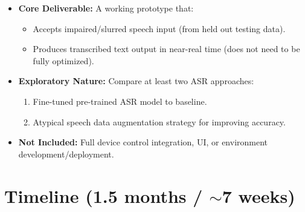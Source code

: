 \documentclass{article}
\begin{document}
\begin{itemize}
    \item \textbf{Core Deliverable:} A working prototype that:
    \begin{itemize}
        \item Accepts impaired/slurred speech input (from held out testing data).
        \item Produces transcribed text output in near-real time (does not need to be fully optimized).
    \end{itemize}
    
    \item \textbf{Exploratory Nature:} Compare at least two ASR approaches:
    \begin{enumerate}
        \item Fine-tuned pre-trained ASR model to baseline.
        \item Atypical speech data augmentation strategy for improving accuracy.
    \end{enumerate}
    
    \item \textbf{Not Included:} Full device control integration, UI, or environment development/deployment.
\end{itemize}

\section{Timeline (1.5 months / $\sim$7 weeks)}
\end{document}
